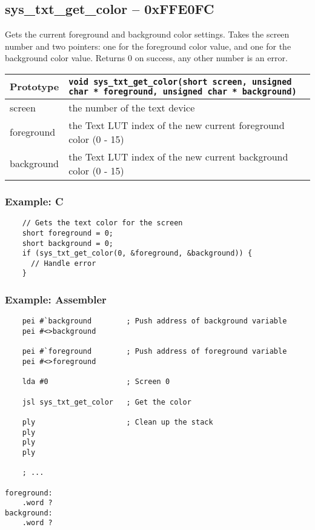 \subsection*{sys\_txt\_get\_color -- 0xFFE0FC}
Gets the current foreground and background color settings.
Takes the screen number and two pointers: one for the foreground color value, and one for the background color value.
Returns 0 on success, any other number is an error.

\bigskip

\begin{tabular}{|l||l|} \hline
Prototype & \lstinline!void sys_txt_get_color(short screen, unsigned char * foreground, unsigned char * background)! \\ \hline
screen & the number of the text device \\ \hline
foreground & the Text LUT index of the new current foreground color (0 - 15) \\ \hline
background & the Text LUT index of the new current background color (0 - 15) \\ \hline
\end{tabular}

\subsubsection*{Example: C}
\begin{lstlisting}
    // Gets the text color for the screen
    short foreground = 0;
    short background = 0;
    if (sys_txt_get_color(0, &foreground, &background)) {
      // Handle error
    }
\end{lstlisting}

\subsubsection*{Example: Assembler}
\begin{verbatim}
    pei #`background        ; Push address of background variable
    pei #<>background

    pei #`foreground        ; Push address of foreground variable
    pei #<>foreground

    lda #0                  ; Screen 0

    jsl sys_txt_get_color   ; Get the color

    ply                     ; Clean up the stack
    ply
    ply
    ply

    ; ...

foreground:
    .word ?
background:
    .word ?
\end{verbatim}


